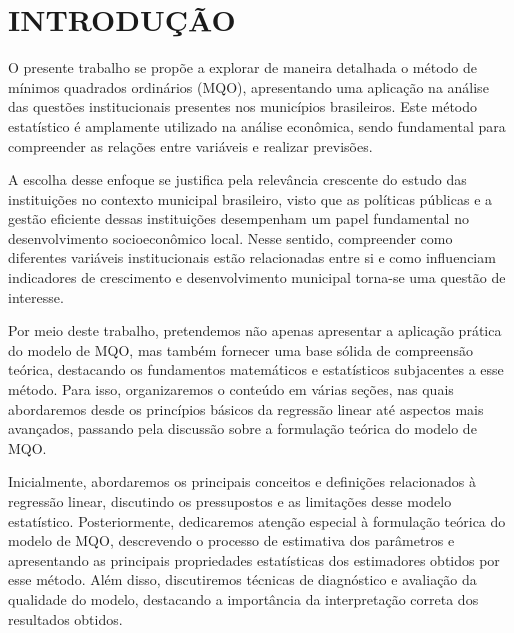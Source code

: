 \documentclass[a4paper,12pt]{article}
\renewcommand*\contentsname{Índice}
\newcommand\contentsname{Índice}
\begin{document}
\newpage
\renewcommand{\contentsname}{SUMÁRIO}
\pagestyle{fancy}
\tableofcontents

\newpage
{}\pagestyle{fancy} \justify \onehalfspacing

\hypertarget{introduuxe7uxe3o}{%
\section{INTRODUÇÃO}\label{introduuxe7uxe3o}}

O presente trabalho se propõe a explorar de maneira detalhada o método
de mínimos quadrados ordinários (MQO), apresentando uma aplicação na
análise das questões institucionais presentes nos municípios
brasileiros. Este método estatístico é amplamente utilizado na análise
econômica, sendo fundamental para compreender as relações entre
variáveis e realizar previsões.

A escolha desse enfoque se justifica pela relevância crescente do estudo
das instituições no contexto municipal brasileiro, visto que as
políticas públicas e a gestão eficiente dessas instituições desempenham
um papel fundamental no desenvolvimento socioeconômico local. Nesse
sentido, compreender como diferentes variáveis institucionais estão
relacionadas entre si e como influenciam indicadores de crescimento e
desenvolvimento municipal torna-se uma questão de interesse.

Por meio deste trabalho, pretendemos não apenas apresentar a aplicação
prática do modelo de MQO, mas também fornecer uma base sólida de
compreensão teórica, destacando os fundamentos matemáticos e
estatísticos subjacentes a esse método. Para isso, organizaremos o
conteúdo em várias seções, nas quais abordaremos desde os princípios
básicos da regressão linear até aspectos mais avançados, passando pela
discussão sobre a formulação teórica do modelo de MQO.

Inicialmente, abordaremos os principais conceitos e definições
relacionados à regressão linear, discutindo os pressupostos e as
limitações desse modelo estatístico. Posteriormente, dedicaremos atenção
especial à formulação teórica do modelo de MQO, descrevendo o processo
de estimativa dos parâmetros e apresentando as principais propriedades
estatísticas dos estimadores obtidos por esse método. Além disso,
discutiremos técnicas de diagnóstico e avaliação da qualidade do modelo,
destacando a importância da interpretação correta dos resultados
obtidos.
\end{document}
